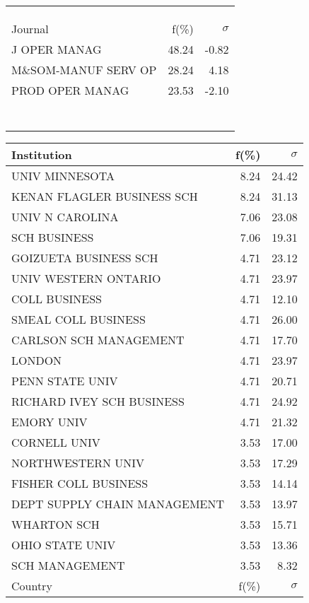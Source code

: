 \documentclass[a4paper,11pt]{report}
\begin{document}
\begin{landscape}
\begin{table}[!ht]
{\begin{tabular}{|l r  r|}
 &  & \\
 &  & \\
 &  & \\
\hline
\hline
Journal & f(\%) & $\sigma$\\
\hline
J OPER MANAG & 48.24 & -0.82\\
M\&SOM-MANUF SERV OP & 28.24 & 4.18\\
PROD OPER MANAG & 23.53 & -2.10\\
 &  & \\
 &  & \\
 &  & \\
 &  & \\
 &  & \\
 &  & \\
 &  & \\
\hline
\end{tabular}
}
{\scriptsize\begin{tabular}{|l r r|}
\hline
Institution & f(\%) & $\sigma$\\
\hline
UNIV MINNESOTA & 8.24 & 24.42\\
KENAN FLAGLER BUSINESS SCH & 8.24 & 31.13\\
UNIV N CAROLINA & 7.06 & 23.08\\
SCH BUSINESS & 7.06 & 19.31\\
GOIZUETA BUSINESS SCH & 4.71 & 23.12\\
UNIV WESTERN ONTARIO & 4.71 & 23.97\\
COLL BUSINESS & 4.71 & 12.10\\
SMEAL COLL BUSINESS & 4.71 & 26.00\\
CARLSON SCH MANAGEMENT & 4.71 & 17.70\\
LONDON & 4.71 & 23.97\\
PENN STATE UNIV & 4.71 & 20.71\\
RICHARD IVEY SCH BUSINESS & 4.71 & 24.92\\
EMORY UNIV & 4.71 & 21.32\\
CORNELL UNIV & 3.53 & 17.00\\
NORTHWESTERN UNIV & 3.53 & 17.29\\
FISHER COLL BUSINESS & 3.53 & 14.14\\
DEPT SUPPLY CHAIN MANAGEMENT & 3.53 & 13.97\\
WHARTON SCH & 3.53 & 15.71\\
OHIO STATE UNIV & 3.53 & 13.36\\
SCH MANAGEMENT & 3.53 & 8.32\\
\hline
\hline
Country & f(\%) & $\sigma$\\

\end{tabular}}
\end{table}
\end{landscape}
\end{document}
